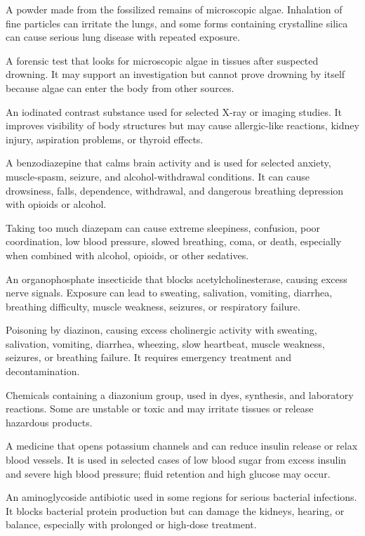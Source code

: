  A powder made from the fossilized remains of microscopic algae. Inhalation of fine particles can irritate the lungs, and some forms containing crystalline silica can cause serious lung disease with repeated exposure.

 A forensic test that looks for microscopic algae in tissues after suspected drowning. It may support an investigation but cannot prove drowning by itself because algae can enter the body from other sources.

 An iodinated contrast substance used for selected X-ray or imaging studies. It improves visibility of body structures but may cause allergic-like reactions, kidney injury, aspiration problems, or thyroid effects.

 A benzodiazepine that calms brain activity and is used for selected anxiety, muscle-spasm, seizure, and alcohol-withdrawal conditions. It can cause drowsiness, falls, dependence, withdrawal, and dangerous breathing depression with opioids or alcohol.

 Taking too much diazepam can cause extreme sleepiness, confusion, poor coordination, low blood pressure, slowed breathing, coma, or death, especially when combined with alcohol, opioids, or other sedatives.

 An organophosphate insecticide that blocks acetylcholinesterase, causing excess nerve signals. Exposure can lead to sweating, salivation, vomiting, diarrhea, breathing difficulty, muscle weakness, seizures, or respiratory failure.

 Poisoning by diazinon, causing excess cholinergic activity with sweating, salivation, vomiting, diarrhea, wheezing, slow heartbeat, muscle weakness, seizures, or breathing failure. It requires emergency treatment and decontamination.

 Chemicals containing a diazonium group, used in dyes, synthesis, and laboratory reactions. Some are unstable or toxic and may irritate tissues or release hazardous products.

 A medicine that opens potassium channels and can reduce insulin release or relax blood vessels. It is used in selected cases of low blood sugar from excess insulin and severe high blood pressure; fluid retention and high glucose may occur.

 An aminoglycoside antibiotic used in some regions for serious bacterial infections. It blocks bacterial protein production but can damage the kidneys, hearing, or balance, especially with prolonged or high-dose treatment.

